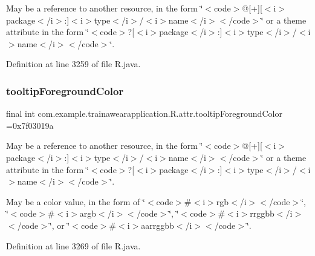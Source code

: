 May be a reference to another resource, in the form \char`\"{}$<$code$>$@\mbox{[}+\mbox{]}\mbox{[}$<$i$>$package$<$/i$>$\+:\mbox{]}$<$i$>$type$<$/i$>$/$<$i$>$name$<$/i$>$$<$/code$>$\char`\"{} or a theme attribute in the form \char`\"{}$<$code$>$?\mbox{[}$<$i$>$package$<$/i$>$\+:\mbox{]}$<$i$>$type$<$/i$>$/$<$i$>$name$<$/i$>$$<$/code$>$\char`\"{}. 

Definition at line 3259 of file R.\+java.

\mbox{\label{classcom_1_1example_1_1trainawearapplication_1_1_r_1_1attr_ae905b136fb9dcb8842c5f02cc2aba1bd}} 
\subsubsection{\texorpdfstring{tooltipForegroundColor}{tooltipForegroundColor}}
{\footnotesize\ttfamily final int com.\+example.\+trainawearapplication.\+R.\+attr.\+tooltip\+Foreground\+Color =0x7f03019a\hspace{0.3cm}{\ttfamily [static]}}

May be a reference to another resource, in the form \char`\"{}$<$code$>$@\mbox{[}+\mbox{]}\mbox{[}$<$i$>$package$<$/i$>$\+:\mbox{]}$<$i$>$type$<$/i$>$/$<$i$>$name$<$/i$>$$<$/code$>$\char`\"{} or a theme attribute in the form \char`\"{}$<$code$>$?\mbox{[}$<$i$>$package$<$/i$>$\+:\mbox{]}$<$i$>$type$<$/i$>$/$<$i$>$name$<$/i$>$$<$/code$>$\char`\"{}. 

May be a color value, in the form of \char`\"{}$<$code$>$\#$<$i$>$rgb$<$/i$>$$<$/code$>$\char`\"{}, \char`\"{}$<$code$>$\#$<$i$>$argb$<$/i$>$$<$/code$>$\char`\"{}, \char`\"{}$<$code$>$\#$<$i$>$rrggbb$<$/i$>$$<$/code$>$\char`\"{}, or \char`\"{}$<$code$>$\#$<$i$>$aarrggbb$<$/i$>$$<$/code$>$\char`\"{}. 

Definition at line 3269 of file R.\+java.

\mbox{\label{classcom_1_1example_1_1trainawearapplication_1_1_r_1_1attr_a7467e0d94f09788a22d5638bde77d239}} 
